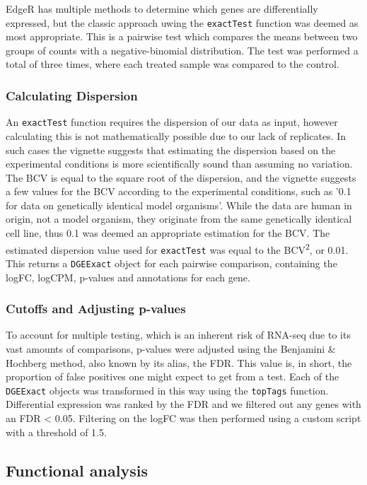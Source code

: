 EdgeR has multiple methods to determine which genes are differentially expressed, but the classic approach uwing the  \texttt{exactTest} function was deemed as most appropriate. This is a pairwise test which compares the means between two groups of counts with a negative-binomial distribution. The test was performed a total of three times, where each treated sample was compared to the control. 

\subsubsection{Calculating Dispersion}
An \texttt{exactTest} function requires the dispersion of our data as input, however calculating this is not mathematically possible due to our lack of replicates. In such cases the vignette suggests that estimating the dispersion based on the experimental conditions is more scientifically sound than assuming no variation. The \ac{BCV} is equal to the square root of the dispersion, and the vignette suggests a few values for the \ac{BCV} according to the experimental conditions, such as '0.1 for data on genetically identical model organisms'. While the data are human in origin, not a model organism, they originate from the same genetically identical cell line, thus 0.1 was deemed an appropriate estimation for the \ac{BCV}. The estimated dispersion value used for \texttt{exactTest} was equal to the BCV\textsuperscript{2}, or 0.01. This returns a \texttt{DGEExact} object for each pairwise comparison, containing the logFC, logCPM, p-values and annotations for each gene. 

\subsubsection{Cutoffs and Adjusting p-values}
To account for multiple testing, which is an inherent risk of RNA-seq due to its vast amounts of comparisons, p-values were adjusted using the Benjamini \& Hochberg method, also known by its alias, the \ac{FDR}. This value is, in short, the proportion of false positives one might expect to get from a test. Each of the \texttt{DGEExact} objects was transformed in this way using the \texttt{topTags} function. Differential expression was ranked by the \ac{FDR} and we filtered out any genes with an \ac{FDR} < 0.05. Filtering on the logFC was then performed using a custom script with a threshold of 1.5.  

\subsection{Functional analysis}



